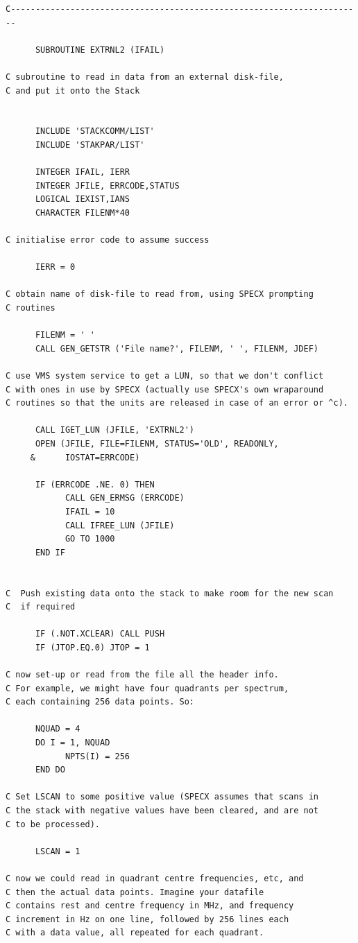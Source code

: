 \documentclass[11pt,twoside]{report}
\begin{document}
\begin{verbatim}
C-----------------------------------------------------------------------

      SUBROUTINE EXTRNL2 (IFAIL)

C subroutine to read in data from an external disk-file,
C and put it onto the Stack


      INCLUDE 'STACKCOMM/LIST'
      INCLUDE 'STAKPAR/LIST'

      INTEGER IFAIL, IERR
      INTEGER JFILE, ERRCODE,STATUS
      LOGICAL IEXIST,IANS
      CHARACTER FILENM*40

C initialise error code to assume success

      IERR = 0

C obtain name of disk-file to read from, using SPECX prompting
C routines

      FILENM = ' '
      CALL GEN_GETSTR ('File name?', FILENM, ' ', FILENM, JDEF)

C use VMS system service to get a LUN, so that we don't conflict
C with ones in use by SPECX (actually use SPECX's own wraparound
C routines so that the units are released in case of an error or ^c).

      CALL IGET_LUN (JFILE, 'EXTRNL2')
      OPEN (JFILE, FILE=FILENM, STATUS='OLD', READONLY,
     &      IOSTAT=ERRCODE)

      IF (ERRCODE .NE. 0) THEN
            CALL GEN_ERMSG (ERRCODE)
            IFAIL = 10
            CALL IFREE_LUN (JFILE)
            GO TO 1000
      END IF


C  Push existing data onto the stack to make room for the new scan
C  if required

      IF (.NOT.XCLEAR) CALL PUSH
      IF (JTOP.EQ.0) JTOP = 1

C now set-up or read from the file all the header info.
C For example, we might have four quadrants per spectrum,
C each containing 256 data points. So:

      NQUAD = 4
      DO I = 1, NQUAD
            NPTS(I) = 256
      END DO

C Set LSCAN to some positive value (SPECX assumes that scans in
C the stack with negative values have been cleared, and are not
C to be processed).

      LSCAN = 1

C now we could read in quadrant centre frequencies, etc, and
C then the actual data points. Imagine your datafile
C contains rest and centre frequency in MHz, and frequency
C increment in Hz on one line, followed by 256 lines each
C with a data value, all repeated for each quadrant.


\end{verbatim}
\end{document}
